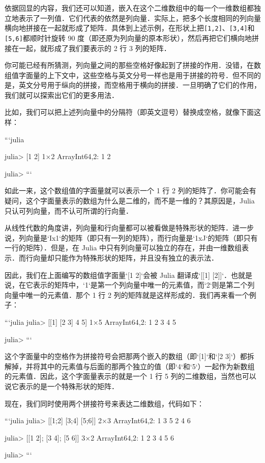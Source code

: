 依据回显的内容，我们还可以知道，嵌入在这个二维数组中的每一个一维数组都独立地表示了一列值．它们代表的依然是列向量．实际上，把多个长度相同的列向量横向地拼接在一起就形成了矩阵．具体到上述示例，在形状上把\verb|[1,2]|、\verb|[3,4]|和\verb|[5,6]|都顺时针旋转 90 度（即还原为列向量的原本形状），然后再把它们横向地拼接在一起，就形成了我们要表示的 2 行 3 列的矩阵．

你可能已经有所猜测，列向量之间的那些空格好像起到了拼接的作用．没错，在数组值字面量的上下文中，这些空格与英文分号一样也是用于拼接的符号．但不同的是，英文分号用于纵向的拼接，而空格用于横向的拼接．一旦明确了它们的作用，我们就可以探索出它们的更多用法．

比如，我们可以把上述列向量中的分隔符（即英文逗号）替换成空格，就像下面这样：

```julia

julia> [1 2]
1×2 Array{Int64,2}:
 1  2

julia> 
```

如此一来，这个数组值的字面量就可以表示一个 1 行 2 列的矩阵了．你可能会有疑问，这个字面量表示的数组为什么是二维的，而不是一维的？其原因是，Julia 只认可列向量，而不认可所谓的行向量．

从线性代数的角度讲，列向量和行向量都可以被看做是特殊形状的矩阵．进一步说，列向量是`Ix1`的矩阵（即只有一列的矩阵），而行向量是`1xJ`的矩阵（即只有一行的矩阵）．但是，在 Julia 中只有列向量可以独立的存在，并由一维数组表示．而行向量却只能作为特殊形状的矩阵，并且没有独立的表示法．

因此，我们在上面编写的数组值字面量`[1 2]`会被 Julia 翻译成`[[1] [2]]`．也就是说，在它表示的矩阵中，`1`是第一个列向量中唯一的元素值，而`2`则是第二个列向量中唯一的元素值．那个 1 行 2 列的矩阵就是这样形成的．我们再来看一个例子：

```julia
julia> [[1] [2 3] 4 5]
1×5 Array{Int64,2}:
 1  2  3  4  5

julia> 
```

这个字面量中的空格作为拼接符号会把那两个嵌入的数组（即`[1]`和`[2 3]`）都拆解掉，并将其中的元素值与后面的那两个独立的值（即`4`和`5`）一起作为新数组的元素值．因此，这个字面量表示的就是一个 1 行 5 列的二维数组，当然也可以说它表示的是一个特殊形状的矩阵．

现在，我们同时使用两个拼接符号来表达二维数组，代码如下：

```julia
julia> [[1;2] [3;4] [5;6]]
2×3 Array{Int64,2}:
 1  3  5
 2  4  6

julia> [[1 2]; [3 4]; [5 6]]
3×2 Array{Int64,2}:
 1  2
 3  4
 5  6

julia> 
```

